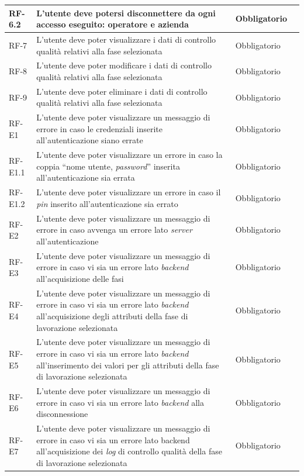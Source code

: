 \begin{longtable}{>{\centering\arraybackslash}m{}>{\centering\arraybackslash}m{}>{\centering\arraybackslash}m{}>{\centering\arraybackslash}m{}}
    \hline
    RF-6.2 & L’utente deve potersi disconnettere da ogni accesso eseguito: operatore e azienda & Obbligatorio \\
    \hline
    RF-7 & L’utente deve poter visualizzare i dati di controllo qualità relativi alla fase selezionata & Obbligatorio \\
    \hline
    RF-8 & L’utente deve poter modificare i dati di controllo qualità relativi alla fase selezionata & Obbligatorio \\
    \hline
    RF-9 & L’utente deve poter eliminare i dati di controllo qualità relativi alla fase selezionata & Obbligatorio \\
    \hline
    RF-E1 & L’utente deve poter visualizzare un messaggio di errore in caso le credenziali inserite all’autenticazione siano errate & Obbligatorio \\
    \hline
    RF-E1.1 & L’utente deve poter visualizzare un errore in caso la coppia “nome utente, \textit{password}” inserita all’autenticazione sia errata & Obbligatorio \\
    \hline
    RF-E1.2 & L’utente deve poter visualizzare un errore in caso il \textit{pin} inserito all’autenticazione sia errato & Obbligatorio \\
    \hline
    RF-E2 & L’utente deve poter visualizzare un messaggio di errore in caso avvenga un errore lato \textit{server} all’autenticazione & Obbligatorio \\
    \hline
    RF-E3 & L’utente deve poter visualizzare un messaggio di errore in caso vi sia un errore lato \textit{backend} all’acquisizione delle fasi & Obbligatorio \\
    \hline
    RF-E4 & L’utente deve poter visualizzare un messaggio di errore in caso vi sia un errore lato \textit{backend} all’acquisizione degli attributi della fase di lavorazione selezionata & Obbligatorio \\
    \hline
    RF-E5 & L’utente deve poter visualizzare un messaggio di errore in caso vi sia un errore lato \textit{backend} all’inserimento dei valori per gli attributi della fase di lavorazione selezionata & Obbligatorio \\
    \hline
    RF-E6 & L’utente deve poter visualizzare un messaggio di errore in caso vi sia un errore lato \textit{backend} alla disconnessione & Obbligatorio \\
    \hline
    RF-E7 & L’utente deve poter visualizzare un messaggio di errore in caso vi sia un errore lato backend all’acquisizione dei \textit{log} di controllo qualità della fase di lavorazione selezionata & Obbligatorio \\

\end{longtable}
